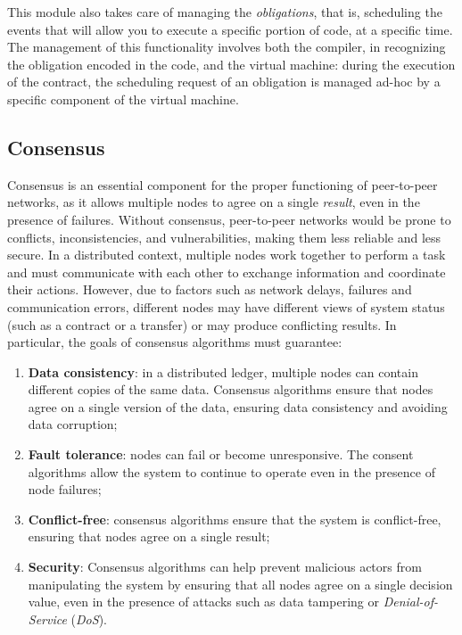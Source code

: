 This module also takes care of managing the \textit{obligations}, that is, scheduling the events that will 
allow you to execute a specific portion of code, at a specific time. The management of this functionality 
involves both the compiler, in recognizing the obligation encoded in the code, and the virtual machine: 
during the execution of the contract, the scheduling request of an obligation is managed ad-hoc by a 
specific component of the virtual machine.

\subsection{Consensus}

Consensus is an essential component for the proper functioning of peer-to-peer networks, as it allows 
multiple nodes to agree on a single \textit{result}, even in the presence of failures. Without consensus, 
peer-to-peer networks would be prone to conflicts, inconsistencies, and vulnerabilities, making them less 
reliable and less secure. In a distributed context, multiple nodes work together to perform a task and 
must communicate with each other to exchange information and coordinate their actions. However, due to 
factors such as network delays, failures and communication errors, different nodes may have different 
views of system status (such as a contract or a transfer) or may produce conflicting results. In 
particular, the goals of consensus algorithms must guarantee:
\begin{enumerate}
	\item \textbf{Data consistency}: in a distributed ledger, multiple nodes can contain different copies of 
	the same data. Consensus algorithms ensure that nodes agree on a single version of the data, ensuring 
	data consistency and avoiding data corruption;
	\item \textbf{Fault tolerance}: nodes can fail or become unresponsive. The consent algorithms allow the 
	system to continue to operate even in the presence of node failures;
	\item \textbf{Conflict-free}: consensus algorithms ensure that the system is conflict-free, ensuring that 
	nodes agree on a single result;
	\item \textbf{Security}: Consensus algorithms can help prevent malicious actors from manipulating the 
	system by ensuring that all nodes agree on a single decision value, even in the presence of attacks such 
	as data tampering or \textit{Denial-of-Service} (\textit{DoS}).
\end{enumerate}

